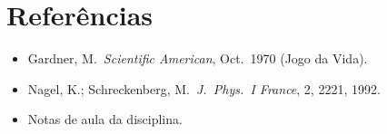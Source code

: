 \documentclass[12pt,a4paper]{article}
\begin{document}
\section*{Refer\^encias}
\begin{itemize}
  \item Gardner, M.\ \textit{Scientific American}, Oct.\ 1970 (Jogo da Vida).
  \item Nagel, K.; Schreckenberg, M.\ \textit{J.\ Phys.\ I France}, 2, 2221, 1992.
  \item Notas de aula da disciplina.
\end{itemize}
\end{document}
